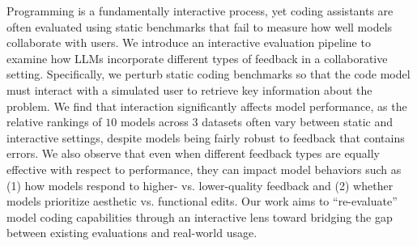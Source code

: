 Programming is a fundamentally interactive process, yet coding assistants are often evaluated using static benchmarks that fail to measure how well models collaborate with users. 
We introduce an interactive evaluation pipeline to examine how LLMs incorporate different types of feedback in a collaborative setting. Specifically, we perturb static coding benchmarks so that the code model must interact with a simulated user to retrieve key information about the problem.
We find that interaction significantly affects model performance, as the relative rankings of $10$ models across $3$ datasets often vary between static and interactive settings, despite models being fairly robust to feedback that contains errors.
We also observe that even when different feedback types are equally effective with respect to performance, they can impact model behaviors such as (1) how models respond to higher- vs. lower-quality feedback and (2) whether models prioritize aesthetic vs. functional edits. 
Our work aims to ``re-evaluate'' model coding capabilities through an interactive lens toward bridging the gap between existing evaluations and real-world usage.

